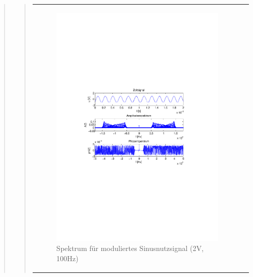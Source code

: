 \begin{quote}
\begin{quote}
\begin{center}
\begin{tabular}{ll}
\begin{minipage}{0.6\textwidth}
                \end{minipage}
                \begin{minipage}{0.6\textwidth}

                     \begin{figure}[H]
                        \label{fig:}
                        \includegraphics[scale=0.5, trim = 4cm 9.5cm 3.5cm
                        9.5cm, clip]{./Bilder/sin_a2_f100}
                        \caption{Spektrum für moduliertes Sinusnutzsignal (2V,
                        100Hz)}
                    \end{figure}
               \vspace{-1.5em}

                \end{minipage}


\end{tabular}
\end{center}
\end{quote}
\end{quote}
